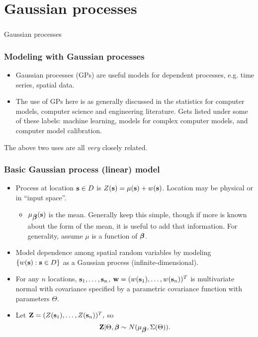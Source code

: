 \documentclass{beamer}
\begin{document}
\section{Gaussian processes}


\begin{frame}
\frametitle{ }
\begin{center}
{\LARGE Gaussian processes}
\end{center}
\end{frame}

\begin{frame}
  \frametitle{Modeling with Gaussian processes }
\begin{itemize}
\item Gaussian processes (GPs) are useful  models for
    dependent processes, e.g. time series, spatial data.
\item The use of GPs here is as generally discussed in the statistics
  for computer models, computer science and engineering
  literature. Gets listed under some of these labels: machine
  learning, models for complex computer models, and computer model
  calibration.
  \end{itemize}
The above two uses are all {\it very} closely related.
\end{frame}

\begin{frame}
  \frametitle{Basic Gaussian process (linear) model}
  \begin{itemize}
  \item Process at location ${\bf s} \in D$ is $Z({\bf s}) = \mu({\bf s})
    + w({\bf s})$. Location may be physical or in ``input space''. 
    \begin{itemize}
    \item $\mu_{\mbox{\boldmath $\beta$}}({\bf s})$ is the mean. Generally keep this simple, though if more is known about the form of the mean, it is useful to add that information.  For generality, assume $\mu$ is a function of $\mbox{\boldmath $\beta$}$.
    \end{itemize}
  \item Model dependence among spatial random variables by modeling
    $\{w({\bf s}):{\bf s} \in D\}$ as a Gaussian process (infinite-dimensional).
  \item For any $n$ locations, ${\bf s}_1,\dots,{\bf s}_n$,
    ${\bf w}=(w({\bf s}_1),\dots,w({\bf s}_n))^T$ is multivariate normal with
    covariance specified by a parametric covariance function with
    parameters $\Theta$.
  \item Let ${\bf Z}=(Z({\bf s}_1),\dots,Z({\bf s}_n))^T,$ so $${\bf Z} | \Theta, \mbox{\boldmath $\beta$} \sim N(\mu_{\mbox{\boldmath $\beta$}}, \Sigma(\Theta)).$$
  \end{itemize}
\end{frame}
\end{document}

